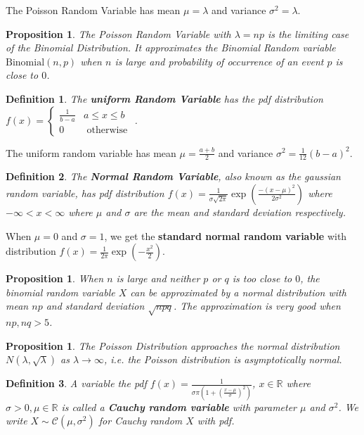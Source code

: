\documentclass[12pt,twoside]{report}
\newtheorem{defn}{Definition}
\newtheorem{prop}[subsection]{Proposition}
\begin{document}
The Poisson Random Variable has mean $\mu = \lambda$ and variance $\sigma^2 = \lambda$.
\begin{prop}
    The Poisson Random Variable with $\lambda = np$ is the limiting case of the Binomial Distribution. It approximates the Binomial Random variable $\text{Binomial}(n,p)$ when $n$ is large and probability of occurrence of an event $p$ is close to $0$.
\end{prop}

\begin{defn}    
    The \textbf{uniform Random Variable} has the pdf distribution $f(x) = \begin{cases} \frac{1}{b-a} & a \leq x \leq b \\ 0 & \text { otherwise }\end{cases}$.
\end{defn}

The uniform random variable has mean $\mu = \frac{a + b}{2}$ and variance $\sigma^2 = \frac{1}{12} (b-a)^2$.

\begin{defn}
    The \textbf{Normal Random Variable}, also known as the gaussian random variable, has pdf distribution $f(x) = \frac{1}{\sigma \sqrt{2 \pi}}  \exp\left(\displaystyle \frac{-(x-\mu)^2}{2 \sigma^2}\right)$ where $-\infty < x < \infty$ where $\mu$ and $\sigma$ are the mean and standard deviation respectively.
\end{defn}

When $\mu = 0$ and $\sigma = 1$, we get the \textbf{standard normal random variable} with distribution $f(x) = \displaystyle\frac{1}{2\pi} \exp(-\frac{x^2}{2})$.

\begin{prop}
    When $n$ is large and neither $p$ or $q$ is too close to $0$, the binomial random variable $X$ can be approximated by a normal distribution with mean $np$ and standard deviation $\sqrt{npq}$. The approximation is very good when $np, nq > 5$.
\end{prop}

\begin{prop}
    The Poisson Distribution approaches the normal distribution $N(\lambda, \sqrt{\lambda})$ as $\lambda \to \infty$, i.e. the Poisson distribution is asymptotically normal.
\end{prop}

\begin{defn}
    A variable the pdf $f(x) = \displaystyle \frac{1}{\sigma \pi (1 + \left( \frac{x - \mu}{\sigma} \right)^2 )}$, $x \in \mathbb{R}$ where $\sigma > 0, \mu \in \mathbb{R}$ is called a \textbf{Cauchy random variable} with parameter $\mu$ and $\sigma^2$.
    We write $X \sim \mathcal{C}(\mu, \sigma^2)$ for Cauchy random $X$ with pdf.
\end{defn}
\end{document}
